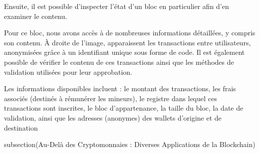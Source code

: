 
Ensuite, il est possible d’inspecter l’état d’un bloc en particulier afin d'en examiner le contenu. 


Pour ce bloc, nous avons accès à de nombreuses informations détaillées, y compris son contenu. À droite de l’image, apparaissent les transactions entre utilisateurs, anonymisées grâce à un identifiant unique sous forme de code. Il est également possible de vérifier le contenu de ces transactions ainsi que les méthodes de validation utilisées pour leur approbation.


Les informations disponibles incluent : le montant des transactions, les frais associés (destinés à rémunérer les mineurs), le registre dans lequel ces transactions sont inscrites, le bloc d'appartenance, la taille du bloc, la date de validation, ainsi que les adresses (anonymes) des wallets d'origine et de destination

subsection(Au-Delà des Cryptomonnaies : Diverses Applications de la Blockchain)



